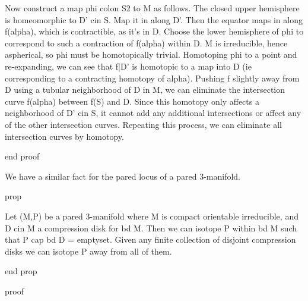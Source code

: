 Now construct a map phi colon S2 to M as follows. The closed upper hemisphere
is homeomorphic to D' cin S. Map it in along D'. Then the equator maps in along
f(alpha), which is contractible, as it's in D. Choose the lower hemisphere of
phi to correspond to such a contraction of f(alpha) within D. M is irreducible,
hence aspherical, so phi must be homotopically trivial. Homotoping phi to
a point and re-expanding, we can see that f|D' is homotopic to a map into D (ie
corresponding to a contracting homotopy of alpha). Pushing f slightly away from
D using a tubular neighborhood of D in M, we can eliminate the intersection
curve f(alpha) between f(S) and D. Since this homotopy only affects
a neighborhood of D' cin S, it cannot add any additional intersections or
affect any of the other intersection curves. Repeating this process, we can
eliminate all intersection curves by homotopy.

end proof

We have a similar fact for the pared locus of a pared 3-manifold.

prop

Let (M,P) be a pared 3-manifold where M is compact orientable irreducible, and
D cin M a compression disk for bd M. Then we can isotope P within bd M such
that P cap bd D = emptyset. Given any finite collection of disjoint compression
disks we can isotope P away from all of them.

end prop

proof


